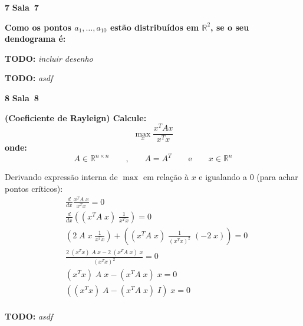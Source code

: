 \documentclass{article}
\newcommand{\R}{\mathbb{R}}
\newenvironment{question}
    {\medskip\bfseries\large}
    {\medskip}
\newcounter{exe-list}
\newenvironment{exe}[2][Sala]
    {\bigskip\noindent\par\ifthenelse{\equal{#1}{}}%
        {\textbf{\LARGE #2}}%
        {\textbf{\LARGE #1~#2}}%
    \medskip\noindent\par}
    {\bigskip}
\newcommand{\todo}[1]{\textbf{TODO:} {\itshape #1}}
\begin{document}
\begin{exe}{7}
    \begin{question}
        Como os pontos \(a_1, \dots, a_{10}\)
        estão distribuídos em \(\R^2\),
        se o seu dendograma é:

        \todo{incluir desenho}
    \end{question}

    \todo{asdf}
\end{exe}

\begin{exe}{8}
    \begin{question}
        (Coeficiente de Rayleign) Calcule:
        \[
            \max_x \frac{ x^T A x }{ x^T x }
        \]
        onde:
        \[
            A \in \R^{n \times n}
            \qquad\text{,}\qquad
            A = A^T
            \qquad\text{e}\qquad
            x \in \R^n
        \]
    \end{question}

    Derivando expressão interna de \(\max\) em relação à \(x\)
    e igualando a \(0\) (para achar pontos críticos):
    \begin{align*}
        &\frac{d}{dx} \frac{ x^T A \; x }{ x^T x } = 0 \\
        &\frac{d}{dx} \left( (x^T A \; x) \; \frac{1}{ x^T x } \right) = 0 \\
        &\left( 2 \; A \; x \; \frac{1}{ x^T x } \right)
            + \left( (x^T A \; x) \; \frac{1}{ (x^T x)^2 } \; (-2 \; x) \right) = 0 \\
        &\frac{
                2 \; (x^T x) \; A \; x
                - 2 \; (x^T A \; x) \; x
            }{ (x^T x)^2 } = 0 \\
        & (x^T x) \; A \; x - (x^T A \; x) \; x = 0 \\
        & ((x^T x) \; A - (x^T A \; x) \; I) \; x = 0 \\
    \end{align*}

    \todo{asdf}
\end{exe}
\end{document}
